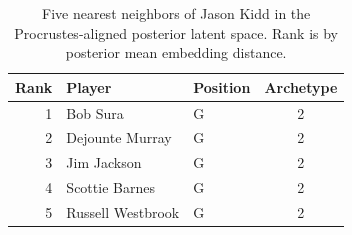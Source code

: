 \begin{table}[htbp]
  \centering\small
  \begin{tabular}{rllc}
    \toprule
    Rank & Player & Position & Archetype \\
    \midrule
    1 & Bob Sura & G & 2 \\
    2 & Dejounte Murray & G & 2 \\
    3 & Jim Jackson & G & 2 \\
    4 & Scottie Barnes & G & 2 \\
    5 & Russell Westbrook & G & 2 \\
    \bottomrule
  \end{tabular}
  \caption{Five nearest neighbors of Jason Kidd in the Procrustes-aligned posterior latent space. Rank is by posterior mean embedding distance.}
  \label{tab:Jason_Kidd_neighbors}
\end{table}

